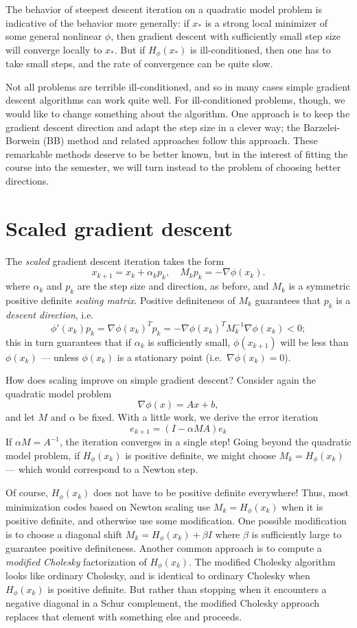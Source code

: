 \documentclass[12pt, leqno]{article} %
\begin{document}
The behavior of steepest descent iteration on a quadratic model
problem is indicative of the behavior more generally: if $x_*$ is a
strong local minimizer of some general nonlinear $\phi$, then gradient
descent with sufficiently small step size will converge locally to
$x_*$.  But if $H_{\phi}(x_*)$ is ill-conditioned, then one has to
take small steps, and the rate of convergence can be quite slow.

Not all problems are terrible ill-conditioned, and so in many cases
simple gradient descent algorithms can work quite well.  For
ill-conditioned problems, though, we would like to change something
about the algorithm.  One approach is to keep the gradient descent
direction and adapt the step size in a clever way; the
Barzelei-Borwein (BB) method and related approaches follow this
approach.  These remarkable methods deserve to be better known,
but in the interest of fitting the course into the semester, we will
turn instead to the problem of choosing better directions.

\section{Scaled gradient descent}

The {\em scaled} gradient descent iteration takes the form
\[
  x_{k+1} = x_k + \alpha_k p_k, \quad M_k p_k = -\nabla \phi(x_k).
\]
where $\alpha_k$ and $p_k$ are the step size and direction, as before,
and $M_k$ is a symmetric positive definite {\em scaling matrix}.
Positive definiteness of $M_k$ guarantees that $p_k$ is a
{\em descent direction}, i.e.~
\[
\phi'(x_k) p_k = \nabla \phi(x_k)^T p_k
= -\nabla \phi(x_k)^T M_k^{-1} \nabla \phi(x_k) < 0;
\]
this in turn guarantees that if $\alpha_k$ is sufficiently small,
$\phi(x_{k+1})$ will be less than $\phi(x_k)$ --- unless $\phi(x_k)$ is
a stationary point (i.e.~$\nabla \phi(x_k) = 0$).

How does scaling improve on simple gradient descent?  Consider again
the quadratic model problem
\[
  \nabla \phi(x) = Ax + b,
\]
and let $M$ and $\alpha$ be fixed.  With a little work, we derive the
error iteration
\[
  e_{k+1} = (I-\alpha MA) e_k
\]
If $\alpha M = A^{-1}$, the iteration converges in a single step!
Going beyond the quadratic model problem, if $H_{\phi}(x_k)$ is
positive definite, we might choose $M_k = H_{\phi}(x_k)$ ---
which would correspond to a Newton step.

Of course, $H_{\phi}(x_k)$ does not have to be positive definite
everywhere!  Thus, most minimization codes based on Newton scaling use
$M_k = H_{\phi}(x_k)$ when it is positive definite, and otherwise use
some modification.  One possible modification is to choose a diagonal
shift $M_k = H_{\phi}(x_k) + \beta I$ where $\beta$ is sufficiently
large to guarantee positive definiteness.  Another common approach is
to compute a {\em modified Cholesky} factorization of $H_{\phi}(x_k)$.
The modified Cholesky algorithm looks like ordinary Cholesky, and is
identical to ordinary Cholesky when $H_{\phi}(x_k)$ is positive
definite.  But rather than stopping when it encounters a negative
diagonal in a Schur complement, the modified Cholesky approach
replaces that element with something else and proceeds.
\end{document}
